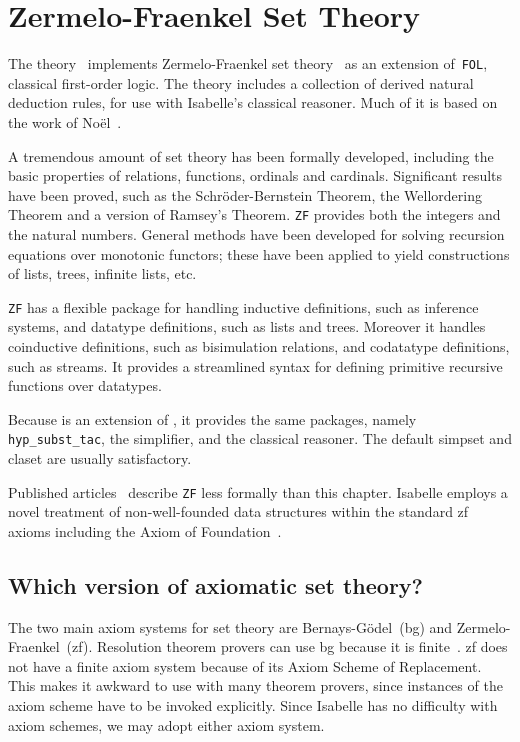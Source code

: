 \chapter{Zermelo-Fraenkel Set Theory}

The theory~ implements Zermelo-Fraenkel set
theory~\cite{halmos60,suppes72} as an extension of~\texttt{FOL}, classical
first-order logic.  The theory includes a collection of derived natural
deduction rules, for use with Isabelle's classical reasoner.  Much
of it is based on the work of No\"el~\cite{noel}.

A tremendous amount of set theory has been formally developed, including the
basic properties of relations, functions, ordinals and cardinals.  Significant
results have been proved, such as the Schr\"oder-Bernstein Theorem, the
Wellordering Theorem and a version of Ramsey's Theorem.  \texttt{ZF} provides
both the integers and the natural numbers.  General methods have been
developed for solving recursion equations over monotonic functors; these have
been applied to yield constructions of lists, trees, infinite lists, etc.

\texttt{ZF} has a flexible package for handling inductive definitions,
such as inference systems, and datatype definitions, such as lists and
trees.  Moreover it handles coinductive definitions, such as
bisimulation relations, and codatatype definitions, such as streams.  It
provides a streamlined syntax for defining primitive recursive functions over
datatypes. 

Because {\ZF} is an extension of {\FOL}, it provides the same
packages, namely \texttt{hyp_subst_tac}, the simplifier, and the
classical reasoner.  The default simpset and claset are usually
satisfactory.

Published articles~\cite{paulson-set-I,paulson-set-II} describe \texttt{ZF}
less formally than this chapter.  Isabelle employs a novel treatment of
non-well-founded data structures within the standard {\sc zf} axioms including
the Axiom of Foundation~\cite{paulson-mscs}.


\section{Which version of axiomatic set theory?}
The two main axiom systems for set theory are Bernays-G\"odel~({\sc bg})
and Zermelo-Fraenkel~({\sc zf}).  Resolution theorem provers can use {\sc
  bg} because it is finite~\cite{boyer86,quaife92}.  {\sc zf} does not
have a finite axiom system because of its Axiom Scheme of Replacement.
This makes it awkward to use with many theorem provers, since instances
of the axiom scheme have to be invoked explicitly.  Since Isabelle has no
difficulty with axiom schemes, we may adopt either axiom system.

